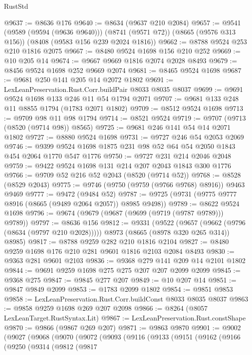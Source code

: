 \begin{lexlean}{RustStd}
\begin{coremodule}
{\begin{coremodule}
{{{{{{{{{{{{{{{{{{{{{{{{{{{{{{{{{{{{{{{{{{{{{{{@9637 := @8636 @176
@9640 := @8634 (@9637 @210 @2084)
@9657 := @9541
    (@9589 (@9594 (@9636 @9640)))
    (@8741 (@9571 @72))
    (@8665 (@9576 @313 @156))
    (@8408 (@9583 @156 @239 @2024 @1816))
@9662 := @8788 @9524 @253 @210 @1816 @2075
@9667 := @8480 @9524 @1698 @156 @210 @252
@9669 := @10 @205 @14
@9674 := @9667 @9669 @1816 @2074 @2028 @8493
@9679 := @8456 @9524 @1698 @252 @9669 @2074
@9681 := @8465 @9524 @1698
@9687 := @9681 @250 @141 @205 @14 @2072 @1802
@9691 := LexLeanPreservation.Rust.Corr.buildPair @8033 @8035 @8037
@9699 := @9691 @9524 @1698 @133 @246 @11 @54 @1794 @2071
@9707 := @9681 @133 @248 @11 @8855 @1794 (@1783 @2071 @1802)
@9709 := @8512 @9524 @1698
@9713 := @9709 @98 @11 @98 @1794
@9714 := @8521 @9524
@9719 := @9707 (@9713 (@8520 (@9714 @98)) @8565)
@9725 := @9681 @246 @141 @54 @14 @2071 @1802
@9727 := @8880 @9524 @1698
@9731 := @9727 @246 @54 @2053 @2069
@9746 := @9399 @9524 @1698 @1875 @231 @98 @52 @64 @54 @2050 @1843 @454 @2064 @1770 @547 @1776
@9750 := @9727 @231 @214 @2046 @2048
@9759 := @9422 @9524 @1698 @131 @214 @207 @2043 @1843 @300 @1776
@9766 := @9709 @52 @216 @52 @2043 (@8520 (@9714 @52))
@9768 := @8528 (@8529 @2043)
@9775 := @9746 (@9750 (@9759 (@9766 @9768) @8916)) @9463 @9469
@9777 := @9472 (@9484 @52)
@9787 := @9725 (@9731 (@9775 @9777 @8916 (@8665 (@9489 @2064 @2057)) @8985 @9498))
@9789 := @8622 @9524 @1698
@9796 := @9674 (@9679 (@9687 (@9699 (@9719 (@9787 @9789))) @9789))
@9797 := @8636 @156
@9812 := @9331
    (@9522
      (@9657 (@9662 (@9796 (@8634 (@9797 @210 @2028)))))
      @8973
      (@8665 (@8978 @320 @265 @314))
      @8985)
@9817 := @8788 @9259 @282 @210 @1816 @2104
@9827 := @8480 @9259 @1698 @176 @210 @281 @9601 @1816 @2103 @2084 @8493
@9830 := @9363 @281 @9601 @2103
@9836 := @9368 @279 @141 @209 @14 @2101 @1802
@9844 := @9691 @9259 @1698 @275 @275 @207 @207 @2099 @2099
@9845 := @9368 @275
@9847 := @9845 @277 @207
@9849 := @10 @207 @14
@9851 := @9847 @9849 @2099
@9853 := @1783 @2099 @1802
@9854 := @9851 @9853
@9858 := LexLeanPreservation.Rust.Corr.buildConst @8033 @8035 @8037
@9863 := @9858 @9259 @1698 @269 @207 @2098
@9866 := @8264 (@8057 LexLeanTarget.RustSyntax.Lit)
@9867 := LexLeanPreservation.Rust.constShape
@9870 := @9866 (@9867 @269 @207)
@9871 := @9863 @9870
@9901 := @9002
    (@9027
      (@9068
        (@9070
          (@9072
            (@9093
              (@9116
                (@9133
                  (@9151
                    (@9162
                      (@9166
                        (@9250
                          (@9314
                            (@9812
                              (@9817
}}}}}}}}}}}}}}}}}}}}}}}}}}}}}}}}}}}}}}}}}}}}}}}
\end{coremodule}}
\end{coremodule}
\end{lexlean}

